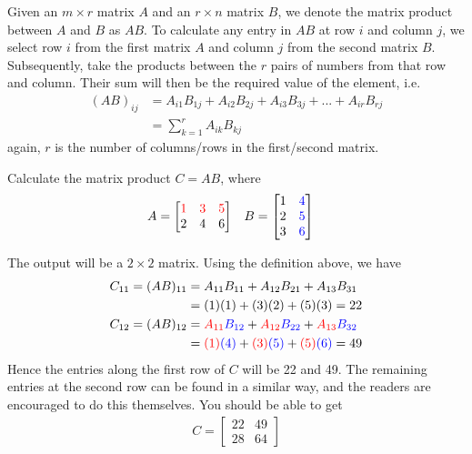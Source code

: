 \begin{defn}
\label{defn:matprod}
Given an $m \times r$ matrix $A$ and an $r \times n$ matrix $B$, we denote the matrix product between $A$ and $B$ as $AB$. To calculate any entry in $AB$ at row $i$ and column $j$, we select row $i$ from the first matrix $A$ and column $j$ from the second matrix $B$. Subsequently, take the products between the $r$ pairs of numbers from that row and column. Their sum will then be the required value of the element, i.e.\
\begin{align*}
(AB)_{ij} &= A_{i1}B_{1j} + A_{i2}B_{2j} + A_{i3}B_{3j} + ... + A_{ir}B_{rj} \\
&= \sum_{k=1}^{r} A_{ik}B_{kj}
\end{align*}
again, $r$ is the number of columns/rows in the first/second matrix.
\end{defn}
\begin{exmp}
Calculate the matrix product $C = AB$, where
\begin{align*}
& A = 
\begin{bmatrix}
\textcolor{red}{1} & \textcolor{red}{3} & \textcolor{red}{5} \\
2 & 4 & 6 
\end{bmatrix} &
& B = 
\begin{bmatrix}
1 & \textcolor{blue}{4} \\
2 & \textcolor{blue}{5} \\
3 & \textcolor{blue}{6}
\end{bmatrix}
\end{align*}
\end{exmp}
\begin{solution}
The output will be a $2 \times 2$ matrix. Using the definition above, we have
\begin{align*}
C_{11} = (AB)_{11} &= A_{11}B_{11} + A_{12}B_{21} + A_{13}B_{31} \\
&= (1)(1) + (3)(2) + (5)(3) = 22 \\
C_{12} = (AB)_{12} &= \textcolor{red}{A_{11}}\textcolor{blue}{B_{12}} + \textcolor{red}{A_{12}}\textcolor{blue}{B_{22}} + \textcolor{red}{A_{13}}\textcolor{blue}{B_{32}} \\
&= \textcolor{red}{(1)}\textcolor{blue}{(4)} + \textcolor{red}{(3)}\textcolor{blue}{(5)} + \textcolor{red}{(5)}\textcolor{blue}{(6)} = 49
\end{align*}
Hence the entries along the first row of $C$ will be 22 and 49. The remaining entries at the second row can be found in a similar way, and the readers are encouraged to do this themselves. You should be able to get
\begin{align*}
C = 
\begin{bmatrix}
22 & 49 \\
28 & 64
\end{bmatrix}   
\end{align*}
\end{solution}


